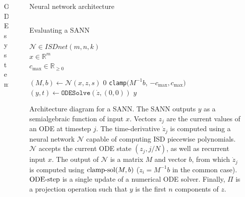 \documentclass[final]{beamer}
\newcommand{\isdnet}{ISDnet}
\newcommand{\ODESolve}{\texttt{ODESolve}}
\newcommand{\SANN}{\texttt{SANN}}
\newlength{\sepwidth}
\newlength{\lrcolwidth}
\newlength{\mcolwidth}
\newcommand{\separatorcolumn}{\begin{column}{\sepwidth}\end{column}}
\begin{document}
\begin{frame}[t]
\begin{columns}[t]
\begin{column}{\mcolwidth}
\begin{block}{ODE system}
  \end{block}
\end{column}

\separatorcolumn

\begin{column}{\lrcolwidth}

  \begin{block}{Neural network architecture}
    \begin{columns}
      \begin{column}{0.7\textwidth}
        \begin{algorithm}[H]
          \caption{Evaluating a SANN}
          \label{alg-sann}
          \begin{algorithmic}[1]
              \Require $\mathcal{N} \in \isdnet(m, n, k)$ \\
              $x \in \mathbb{R}^m$ \\
              $c_{\max} \in \mathbb{R}_{\ge 0}$
              
              \Function {\SANN}{$\mathcal{N}$, $x$, $c_{\max}$} 
                      \State $(M, b) \leftarrow \mathcal{N}(x, z, s)$ \label{line-Mb}
                       \label{line-M-singular-1}
                          \State \Return $0$ \label{line-M-singular-2}
                      \Else 
                          \State \Return \texttt{clamp}$(M^{-1} b$, $-c_{\max}, c_{\max})$ \label{line-clamp}
                      \EndIf
                  \EndFunction
                  \State $(y, t) \leftarrow \ODESolve( \dot{z}, (0, 0) )$ \label{line-ODESolve}
                  \State \Return $y$
              \EndFunction
            \end{algorithmic}
          \end{algorithm}

          Architecture diagram for a SANN. The SANN outputs $y$ as a semialgebraic function of input $x$. Vectors $z_j$ are the current values of an ODE at timestep $j$. The time-derivative $\dot{z}_j$ is computed using a neural network $\mathcal{N}$ capable of computing ISD piecewise polynomials. $\mathcal{N}$ accepts the current ODE state $(z_j, j/N)$, as well as recurrent input $x$. The output of $\mathcal{N}$ is a matrix $M$ and vector $b$, from which $\dot{z}_j$ is computed using $\hbox{clamp-sol}(M, b)$ ($\dot{z}_i = M^{-1} b$ in the common case). $\hbox{ODE-step}$ is a single update of a numerical ODE solver. Finally, $\Pi$ is a projection operation such that $y$ is the first $n$ components of $z$. 
      \end{column}
      \begin{column}{0.3\textwidth}


\end{column}
\end{columns}
\end{block}
\end{column}
\end{columns}
\end{frame}
\end{document}
